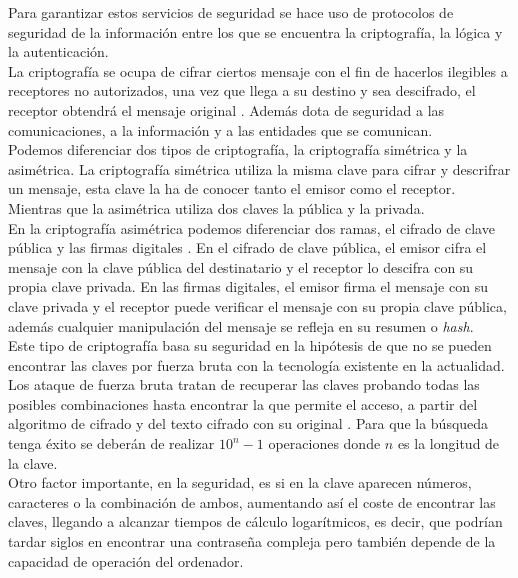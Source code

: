 Para garantizar estos servicios de seguridad se hace uso de protocolos de seguridad de la información entre los que se encuentra la criptografía, la lógica y la autenticación.\\

La criptografía se ocupa de cifrar ciertos mensaje con el fin de hacerlos ilegibles a receptores no autorizados, una vez que llega a su destino y sea descifrado, el receptor obtendrá el mensaje original \cite{criptografia}. Además dota de seguridad a las comunicaciones, a la información y a las entidades que se comunican.\\

Podemos diferenciar dos tipos de criptografía, la criptografía simétrica y la asimétrica. La criptografía simétrica utiliza la misma clave para cifrar y descrifrar un mensaje, esta clave la ha de conocer tanto el emisor como el receptor. Mientras que la asimétrica utiliza dos claves la pública y la privada.\\

En la criptografía asimétrica podemos diferenciar dos ramas, el cifrado de clave pública y las firmas digitales \cite{criptografia-asimetrica}. En el cifrado de clave pública, el emisor cifra el mensaje con la clave pública del destinatario y el receptor lo descifra con su propia clave privada. En las firmas digitales, el emisor firma el mensaje con su clave privada y el receptor puede verificar el mensaje con su propia clave pública, además cualquier manipulación del mensaje se refleja en su resumen o \textit{hash}.\\

Este tipo de criptografía basa su seguridad en la hipótesis de que no se pueden encontrar las claves por fuerza bruta con la tecnología existente en la actualidad. Los ataque de fuerza bruta tratan de recuperar las claves probando todas las posibles combinaciones hasta encontrar la que permite el acceso, a partir del algoritmo de cifrado y del texto cifrado con su original \cite{fuerza-bruta}. Para que la búsqueda tenga éxito se deberán de realizar $10^n-1$ operaciones donde $n$ es la longitud de la clave.\\

Otro factor importante, en la seguridad, es si en la clave aparecen números, caracteres o la combinación de ambos, aumentando así el coste de encontrar las claves, llegando a alcanzar tiempos de cálculo logarítmicos, es decir, que podrían tardar siglos en encontrar una contraseña compleja pero también depende de la capacidad de operación del ordenador.\\

